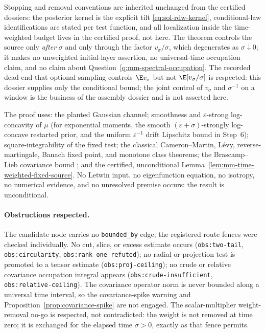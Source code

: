 \documentclass[../main.tex]{subfiles}
\begin{document}
\begin{remark}
\label{rem:sol-rdw-scope}
Stopping and removal conventions are inherited unchanged from the certified dossiers:
the posterior kernel is the explicit tilt \eqref{eq:sol-rdw-kernel}, conditional-law
identifications are stated per test function, and all localization inside the
time-weighted budget lives in the certified proof, not here.  The theorem controls the
source only \emph{after} $\sigma$ and only through the factor $v_\sigma/\sigma$, which
degenerates as $\sigma\downarrow0$; it makes no unweighted initial-layer assertion, no
universal-time occupation claim, and no claim about
Question~\ref{q:mm-spectral-occupation}.  The recorded dead end that optional sampling
controls $\E v_\sigma$ but not $\E[v_\sigma/\sigma]$ is respected: this dossier
supplies only the conditional bound; the joint control of $v_\sigma$ and $\sigma^{-1}$
on a window is the business of the assembly dossier and is not asserted here.
\end{remark}

\begin{remark}
\label{rem:sol-rdw-hypotheses}
The proof uses: the planted Gaussian channel; smoothness and
$\varepsilon$-strong log-concavity of $\mu$ (for exponential moments, the smooth
$(\varepsilon+\sigma)$-strongly log-concave restarted prior, and the uniform
$\varepsilon^{-1}$ drift Lipschitz bound in Step~6); square-integrability of the fixed
test; the classical Cameron--Martin, L\'evy, reverse-martingale, Banach fixed point,
and monotone class theorems; the Brascamp--Lieb covariance bound
\cite{BrascampLieb1976}; and the certified, unconditional
Lemma~\ref{lem:mm-time-weighted-fixed-source}.  No Letwin input, no eigenfunction
equation, no isotropy, no numerical evidence, and no unresolved premise occurs: the
result is unconditional.
\end{remark}

\paragraph{Obstructions respected.}
The candidate node carries no \texttt{bounded\_by} edge; the registered route fences
were checked individually.  No cut, slice, or excess estimate occurs
(\texttt{obs:two-tail}, \texttt{obs:circularity}, \texttt{obs:rank-one-refuted}); no
radial or projection test is promoted to a tensor estimate
(\texttt{obs:proj-ceiling}); no crude or relative covariance occupation integral
appears (\texttt{obs:crude-insufficient}, \texttt{obs:relative-ceiling}).  The
covariance operator norm is never bounded along a universal time interval, so the
covariance-spike warning and Proposition~\ref{prop:covariance-spike} are not engaged.
The scalar-multiplier weight-removal no-go is respected, not contradicted: the weight
is not removed at time zero; it is exchanged for the elapsed time $\sigma>0$, exactly
as that fence permits.
\end{document}
